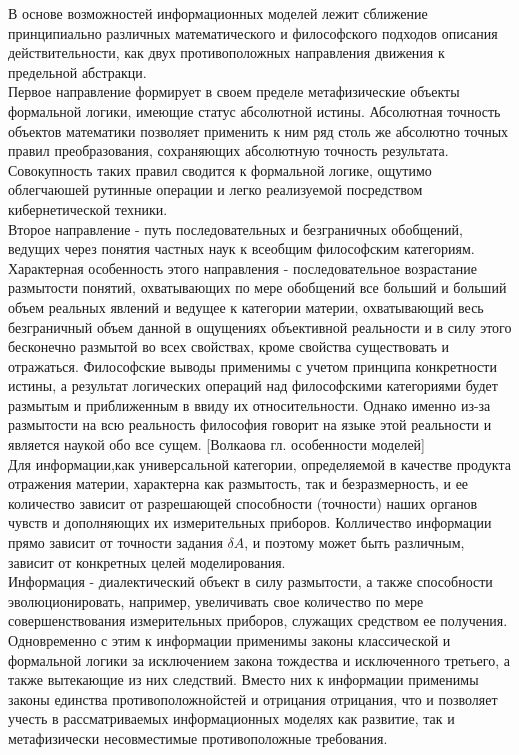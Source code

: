 \documentclass[a4paper,12pt]{report}
\begin{document}
В основе возможностей информационных моделей лежит сближение  принципиально различных математического и философского подходов описания действительности, как двух противоположных направления движения к предельной абстракци.\\ Первое направление формирует в своем пределе метафизические объекты формальной логики, имеющие статус абсолютной истины. Абсолютная точность объектов математики позволяет применить к ним ряд столь же абсолютно точных правил преобразования, сохраняющих абсолютную точность результата. Совокупность таких правил сводится к формальной логике, ощутимо облегчаюшей рутинные операции и легко реализуемой посредством кибернетической техники.\\
 Второе направление - путь последовательных и безграничных обобщений, ведущих через понятия частных наук к всеобщим философским категориям. Характерная особенность этого направления - последовательное возрастание размытости понятий, охватывающих по мере обобщений все больший и больший объем реальных явлений и ведущее к категории материи, охватывающий весь безграничный объем данной в ощущениях объективной реальности и в силу этого бесконечно размытой во всех свойствах, кроме свойства существовать и отражаться. Философские выводы применимы с учетом принципа конкретности истины, а результат логических операций над философскими категориями будет размытым и приближенным в ввиду их относительности. Однако именно из-за размытости на всю реальность философия говорит на языке этой реальности и является наукой обо все сущем. [Волкаова гл. особенности моделей]\\ 
 Для информации,как универсальной категории, определяемой в качестве продукта отражения материи, характерна как размытость, так и безразмерность, и ее количество зависит от разрешающей способности (точности) наших органов чувств и дополняющих их измерительных приборов. Колличество информации прямо зависит от точности задания $\delta A$, и поэтому может быть различным, зависит от конкретных целей моделирования.\\
 Информация - диалектический объект в силу размытости, а также способности эволюционировать, например, увеличивать свое количество по мере совершенствования измерительных приборов, служащих средством ее получения. Одновременно с этим к информации применимы законы классической и формальной логики за исключением закона тождества и исключенного третьего, а также вытекающие из них следствий. Вместо них к информации применимы законы единства противоположнойстей и отрицания отрицания, что и позволяет учесть в рассматриваемых информационных моделях как развитие, так и метафизически несовместимые противоположные требования.\\
\end{document}
